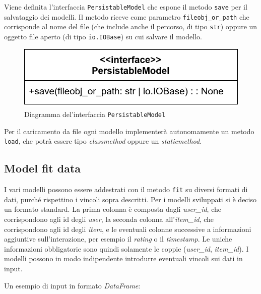 Viene definita l'interfaccia \texttt{PersistableModel} che espone il metodo \texttt{save} per il salvataggio dei modelli. Il metodo riceve come parametro \texttt{fileobj\_or\_path} che corrisponde al nome del file (che include anche il percorso, di tipo \texttt{str}) oppure un oggetto file aperto (di tipo \texttt{io.IOBase}) su cui salvare il modello.

\begin{figure}[htbp]
    \centering
    \includegraphics[scale=0.2]{figures/UML/models/persistable_model.png}
    \caption{Diagramma del'interfaccia \texttt{PersistableModel}}
\end{figure}

Per il caricamento da file ogni modello implementerà autonomamente un metodo \texttt{load}, che potrà essere tipo \textit{classmethod} oppure un \textit{staticmethod}.

\subsection{Model fit data}\label{model_fit_data}

I vari modelli possono essere addestrati con il metodo \texttt{fit} su diversi formati di dati, purché rispettino i vincoli sopra descritti. Per i modelli sviluppati si è deciso un formato standard. La prima colonna è composta dagli \textit{user\_id}, che corrispondono agli id degli \textit{user}, la seconda colonna all'\textit{item\_id}, che corrispondono agli id degli \textit{item}, e le eventuali colonne successive a informazioni aggiuntive sull'interazione, per esempio il \textit{rating} o il \textit{timestamp}. Le uniche informazioni obbligatorie sono quindi solamente le coppie (\textit{user\_id}, \textit{item\_id}). I modelli possono in modo indipendente introdurre eventuali vincoli sui dati in input.

Un esempio di input in formato \textit{DataFrame}:

